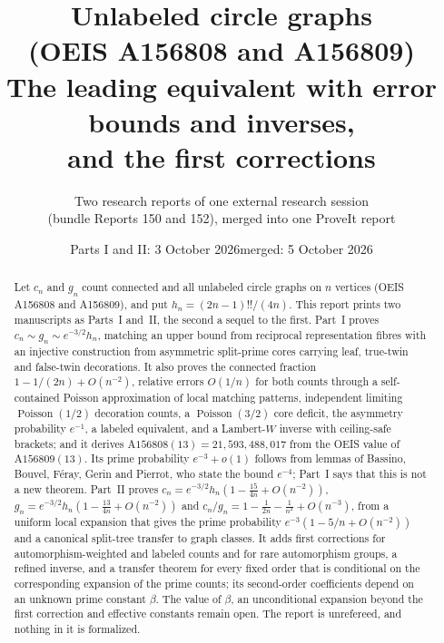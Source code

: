 \documentclass[11pt,letterpaper]{article}
\title{\textbf{Unlabeled circle graphs\\ (OEIS A156808 and A156809)}\\[7pt]
\large The leading equivalent with error bounds and inverses,\\ and the first corrections}
\author{Two research reports of one external research session\\(bundle Reports 150 and 152), merged into one ProveIt report}
\date{Parts I and II: 3 October 2026\quad merged: 5 October 2026}
\numberwithin{equation}{section}
\theoremstyle{definition}\newtheorem{definition}[theorem]{Definition}
\theoremstyle{remark}\newtheorem{remark}[theorem]{Remark}
\DeclareMathOperator{\Poi}{Poisson}
\begin{document}
\hypersetup{pageanchor=false}
\maketitle
\begin{abstract}
Let $c_n$ and $g_n$ count connected and all unlabeled circle graphs on $n$ vertices (OEIS A156808 and A156809), and put $h_n=(2n-1)!!/(4n)$. This report prints two manuscripts as Parts~I and~II, the second a sequel to the first. Part~I proves $c_n\sim g_n\sim e^{-3/2}h_n$, matching an upper bound from reciprocal representation fibres with an injective construction from asymmetric split-prime cores carrying leaf, true-twin and false-twin decorations. It also proves the connected fraction $1-1/(2n)+O(n^{-2})$, relative errors $O(1/n)$ for both counts through a self-contained Poisson approximation of local matching patterns, independent limiting $\Poi(1/2)$ decoration counts, a $\Poi(3/2)$ core deficit, the asymmetry probability $e^{-1}$, a labeled equivalent, and a Lambert-$W$ inverse with ceiling-safe brackets; and it derives $\mathrm{A156808}(13)=21{,}593{,}488{,}017$ from the OEIS value of $\mathrm{A156809}(13)$. Its prime probability $e^{-3}+o(1)$ follows from lemmas of Bassino, Bouvel, F\'eray, Gerin and Pierrot, who state the bound $e^{-4}$; Part~I says that this is not a new theorem. Part~II proves $c_n=e^{-3/2}h_n(1-\frac{15}{4n}+O(n^{-2}))$, $g_n=e^{-3/2}h_n(1-\frac{13}{4n}+O(n^{-2}))$ and $c_n/g_n=1-\frac1{2n}-\frac1{n^2}+O(n^{-3})$, from a uniform local expansion that gives the prime probability $e^{-3}(1-5/n+O(n^{-2}))$ and a canonical split-tree transfer to graph classes. It adds first corrections for automorphism-weighted and labeled counts and for rare automorphism groups, a refined inverse, and a transfer theorem for every fixed order that is conditional on the corresponding expansion of the prime counts; its second-order coefficients depend on an unknown prime constant $\beta$. The value of $\beta$, an unconditional expansion beyond the first correction and effective constants remain open. The report is unrefereed, and nothing in it is formalized.
\end{abstract}
\hypersetup{pageanchor=true}
{\small\setlength{\parskip}{0pt}\tableofcontents}
\newpage
\end{document}
